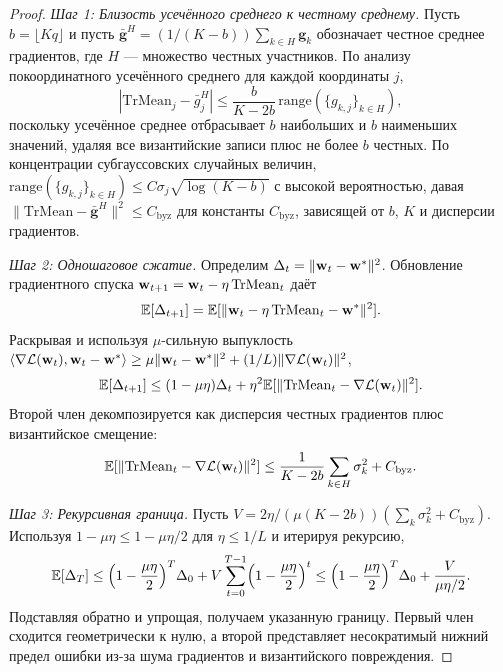 \begin{proof}
\textit{Шаг 1: Близость усечённого среднего к честному среднему.} Пусть $b=\lfloor Kq\rfloor$ и пусть $\bar{\mathbf{g}}^H = (1/(K-b))\sum_{k\in H}\mathbf{g}_k$ обозначает честное среднее градиентов, где $H$ --- множество честных участников. По анализу покоординатного усечённого среднего для каждой координаты $j$,
\begin{equation}
|\mathrm{TrMean}_j - \bar{g}_j^H|
\le \frac{b}{K-2b}\,\mathrm{range}(\{g_{k,j}\}_{k\in H}),
\end{equation}
поскольку усечённое среднее отбрасывает $b$ наибольших и $b$ наименьших значений, удаляя все византийские записи плюс не более $b$ честных. По концентрации субгауссовских случайных величин, $\mathrm{range}(\{g_{k,j}\}_{k\in H})\le C\sigma_j\sqrt{\log(K-b)}$ с высокой вероятностью, давая $\|\mathrm{TrMean}-\bar{\mathbf{g}}^H\|^2\le C_{\mathrm{byz}}$ для константы $C_{\mathrm{byz}}$, зависящей от $b$, $K$ и дисперсии градиентов.

\textit{Шаг 2: Одношаговое сжатие.} Определим $\Delta_t = \|\mathbf{w}_t-\mathbf{w}^*\|^2$. Обновление градиентного спуска $\mathbf{w}_{t+1}=\mathbf{w}_t-\eta\,\mathrm{TrMean}_t$ даёт
\begin{equation}
\mathbb{E}[\Delta_{t+1}]
= \mathbb{E}[\|\mathbf{w}_t - \eta\,\mathrm{TrMean}_t - \mathbf{w}^*\|^2].
\end{equation}
Раскрывая и используя $\mu$-сильную выпуклость $\langle\nabla\mathcal{L}(\mathbf{w}_t),\mathbf{w}_t-\mathbf{w}^*\rangle\ge\mu\|\mathbf{w}_t-\mathbf{w}^*\|^2 + (1/L)\|\nabla\mathcal{L}(\mathbf{w}_t)\|^2$,
\begin{equation}
\mathbb{E}[\Delta_{t+1}]
\le (1-\mu\eta)\Delta_t + \eta^2\mathbb{E}[\|\mathrm{TrMean}_t - \nabla\mathcal{L}(\mathbf{w}_t)\|^2].
\end{equation}
Второй член декомпозируется как дисперсия честных градиентов плюс византийское смещение:
\begin{equation}
\mathbb{E}[\|\mathrm{TrMean}_t - \nabla\mathcal{L}(\mathbf{w}_t)\|^2]
\le \frac{1}{K-2b}\sum_{k\in H}\sigma_k^2 + C_{\mathrm{byz}}.
\end{equation}

\textit{Шаг 3: Рекурсивная граница.} Пусть $V = 2\eta/(\mu(K{-}2b))(\sum_k\sigma_k^2 + C_{\mathrm{byz}})$. Используя $1-\mu\eta\le 1-\mu\eta/2$ для $\eta\le 1/L$ и итерируя рекурсию,
\begin{equation}
\mathbb{E}[\Delta_T]
\le \Bigl(1-\frac{\mu\eta}{2}\Bigr)^T \Delta_0 + V\sum_{t=0}^{T-1}\Bigl(1-\frac{\mu\eta}{2}\Bigr)^t
\le \Bigl(1-\frac{\mu\eta}{2}\Bigr)^T \Delta_0 + \frac{V}{\mu\eta/2}.
\end{equation}
Подставляя обратно и упрощая, получаем указанную границу. Первый член сходится геометрически к нулю, а второй представляет несократимый нижний предел ошибки из-за шума градиентов и византийского повреждения.
\end{proof}


